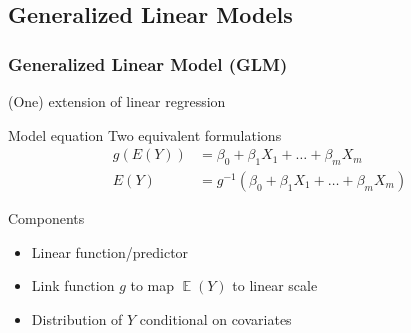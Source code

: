 \documentclass[
    utf8,
    aspectratio=169
]{beamer}  %
\DeclareMathOperator{\E}{\mathbb{E}}  %
\begin{document}
\subsection{Generalized Linear Models}

\begin{frame}
\frametitle{Generalized Linear Model (GLM)}
\begin{block}{(One) extension of linear regression}
\end{block}

\begin{block}{Model equation}
	Two equivalent formulations
	\begin{align*}
		g(E(Y)) &= \beta_0 + \beta_1 X_1 + \dots + \beta_m X_m \\
		E(Y) &= g^{-1}(\beta_0 + \beta_1 X_1 + \dots + \beta_m X_m)
	\end{align*}
\end{block}

\begin{block}{Components}
	\begin{itemize}
		\item Linear function/predictor
		\item Link function $g$ to map $\E(Y)$ to linear scale
		\item Distribution of $Y$ conditional on covariates
	\end{itemize}
\end{block}
\end{frame}
\end{document}
